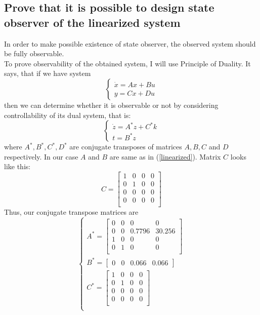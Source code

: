 \documentclass[a4paper,12pt]{article}
\begin{document}
\subsection{Prove that it is possible to design state observer of the linearized
system}
In order to make possible existence of state observer, the observed system should
be fully observable.\\
To prove observability of the obtained system, I will use Principle of Duality.
It says, that if we have system
\begin{equation*}    
    \begin{cases}
        \dot x = Ax + Bu\\
        y = Cx + Du
    \end{cases}
\end{equation*}
then we can determine whether it is observable or not by considering controllability 
of its dual system, that is:
\begin{equation*}    
    \begin{cases}
        \dot z = A^*z + C^*k\\
        t = B^*z
    \end{cases}
\end{equation*}
where $A^*, B^*, C^*, D^*$ are conjugate transposes of matrices $A,B,C$ and $D$ respectively.
In our case $A$ and $B$ are same as in (\ref{linearized}). Matrix $C$ looks like this:
\begin{equation*}
    C=
    \begin{bmatrix}
        1 & 0 & 0 & 0\\
        0 & 1 & 0 & 0\\
        0 & 0 & 0 & 0\\
        0 & 0 & 0 & 0\\
    \end{bmatrix}
\end{equation*}
Thus, our conjugate transpose matrices are
\begin{equation*}
    \begin{cases}
        A^*= 
        \begin{bmatrix}
            0 & 0 & 0 & 0\\
            0 & 0 & 0.7796 & 30.256\\
            1 & 0 & 0 & 0\\
            0 & 1 & 0 & 0\\
        \end{bmatrix}\\
        B^*=
        \begin{bmatrix}
            0 & 0 &  0.066 & 0.066 
        \end{bmatrix}\\
        C^*=
        \begin{bmatrix}
            1 & 0 & 0 & 0\\
            0 & 1 & 0 & 0\\
            0 & 0 & 0 & 0\\
            0 & 0 & 0 & 0\\
        \end{bmatrix}\\
    \end{cases}
\end{equation*}
\end{document}
